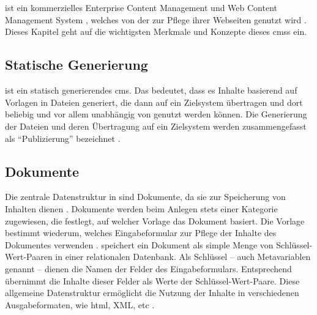 \section{\imperia}
    \label{section:Imperia}
    {\imperia} ist ein kommerzielles Enterprise Content Management und
    Web Content Management System \cite{imperia:about}, welches
    von der {\fernUni} zur Pflege ihrer Webseiten genutzt wird
    \cite{fernUni:imperia}.
    Dieses Kapitel geht auf die wichtigsten Merkmale und Konzepte
    dieses \glspl{cms} ein.

    \subsection{Statische Generierung}
        \label{section:imperiaStaticGeneration}
        {\imperia} ist ein statisch generierendes \gls{cms}.
        Das bedeutet, dass es Inhalte basierend auf Vorlagen
        in Dateien generiert, die dann auf ein Zielsystem übertragen
        und dort beliebig und vor allem unabhängig von
        {\imperia} genutzt werden können.
        Die Generierung der Dateien und deren Übertragung auf ein Zielsystem
        werden zusammengefasst als "`Publizierung"' bezeichnet
        \cite[Kapitel 1.1]{imperia:ecmd}.


    \subsection{Dokumente}
        \label{section:imperiaDocuments}
        Die zentrale Datenstruktur in {\imperia} sind Dokumente,
        da sie zur Speicherung von Inhalten dienen
        \cite[Kapitel 1.1]{imperia:ecmd}.
        Dokumente werden beim Anlegen stets einer Kategorie zugewiesen,
        die festlegt, auf welcher Vorlage
        das Dokument basiert.
        Die Vorlage bestimmt wiederum, welches Eingabeformular
        {\editors} zur Pflege der Inhalte des Dokumentes verwenden
        \cite[Kapitel 1.1.4]{imperia:ecmd}.
        {\imperia} speichert ein Dokument als simple Menge von
        Schlüssel-Wert-Paaren in einer relationalen Datenbank.
        Als Schlüssel -- auch Metavariablen genannt -- dienen die Namen der Felder des Eingabeformulars.
        Entsprechend übernimmt {\imperia} die Inhalte dieser Felder
        als Werte der Schlüssel-Wert-Paare.
        Diese allgemeine Datenstruktur ermöglicht die Nutzung der Inhalte
        in verschiedenen Ausgabeformaten, wie \gls{html}, XML, etc
        \cite[Kapitel 1.1.2]{imperia:ecmd}.

